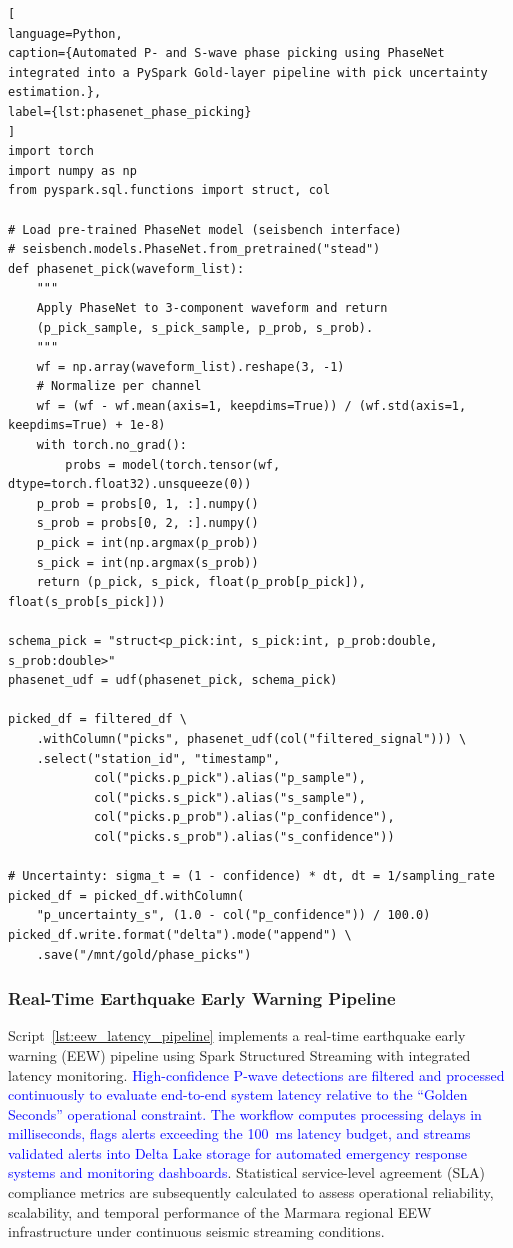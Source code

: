 \documentclass[data,article,submit,pdftex,moreauthors]{Definitions/mdpi}
\begin{document}
\begin{lstlisting}[
language=Python,
caption={Automated P- and S-wave phase picking using PhaseNet integrated into a PySpark Gold-layer pipeline with pick uncertainty estimation.},
label={lst:phasenet_phase_picking}
]
import torch
import numpy as np
from pyspark.sql.functions import struct, col

# Load pre-trained PhaseNet model (seisbench interface)
# seisbench.models.PhaseNet.from_pretrained("stead")
def phasenet_pick(waveform_list):
    """
    Apply PhaseNet to 3-component waveform and return
    (p_pick_sample, s_pick_sample, p_prob, s_prob).
    """
    wf = np.array(waveform_list).reshape(3, -1)
    # Normalize per channel
    wf = (wf - wf.mean(axis=1, keepdims=True)) / (wf.std(axis=1, keepdims=True) + 1e-8)
    with torch.no_grad():
        probs = model(torch.tensor(wf, dtype=torch.float32).unsqueeze(0))
    p_prob = probs[0, 1, :].numpy()
    s_prob = probs[0, 2, :].numpy()
    p_pick = int(np.argmax(p_prob))
    s_pick = int(np.argmax(s_prob))
    return (p_pick, s_pick, float(p_prob[p_pick]), float(s_prob[s_pick]))

schema_pick = "struct<p_pick:int, s_pick:int, p_prob:double, s_prob:double>"
phasenet_udf = udf(phasenet_pick, schema_pick)

picked_df = filtered_df \
    .withColumn("picks", phasenet_udf(col("filtered_signal"))) \
    .select("station_id", "timestamp",
            col("picks.p_pick").alias("p_sample"),
            col("picks.s_pick").alias("s_sample"),
            col("picks.p_prob").alias("p_confidence"),
            col("picks.s_prob").alias("s_confidence"))

# Uncertainty: sigma_t = (1 - confidence) * dt, dt = 1/sampling_rate
picked_df = picked_df.withColumn(
    "p_uncertainty_s", (1.0 - col("p_confidence")) / 100.0)
picked_df.write.format("delta").mode("append") \
    .save("/mnt/gold/phase_picks")
\end{lstlisting}

\subsubsection{Real-Time Earthquake Early Warning Pipeline}

Script~\ref{lst:eew_latency_pipeline} implements a real-time earthquake early warning (EEW) pipeline using Spark Structured Streaming with integrated latency monitoring. \textcolor{blue}{High-confidence P-wave detections are filtered and processed continuously to evaluate end-to-end system latency relative to the ``Golden Seconds'' operational constraint. The workflow computes processing delays in milliseconds, flags alerts exceeding the 100~ms latency budget, and streams validated alerts into Delta Lake storage for automated emergency response systems and monitoring dashboards}. Statistical service-level agreement (SLA) compliance metrics are subsequently calculated to assess operational reliability, scalability, and temporal performance of the Marmara regional EEW infrastructure under continuous seismic streaming conditions.
\end{document}
